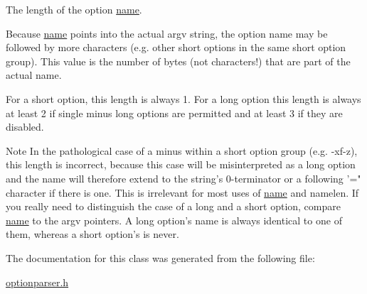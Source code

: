 \-The length of the option \hyperlink{classoption_1_1_option_a02a76b4896abd22d0ba8514362261de9}{name}. 

\-Because \hyperlink{classoption_1_1_option_a02a76b4896abd22d0ba8514362261de9}{name} points into the actual {\ttfamily argv} string, the option name may be followed by more characters (e.\-g. other short options in the same short option group). \-This value is the number of bytes (not characters!) that are part of the actual name.

\-For a short option, this length is always 1. \-For a long option this length is always at least 2 if single minus long options are permitted and at least 3 if they are disabled.

\begin{DoxyNote}{\-Note}
\-In the pathological case of a minus within a short option group (e.\-g. {\ttfamily -\/xf-\/z}), this length is incorrect, because this case will be misinterpreted as a long option and the name will therefore extend to the string's 0-\/terminator or a following '=" character if there is one. \-This is irrelevant for most uses of \hyperlink{classoption_1_1_option_a02a76b4896abd22d0ba8514362261de9}{name} and {\ttfamily namelen}. \-If you really need to distinguish the case of a long and a short option, compare \hyperlink{classoption_1_1_option_a02a76b4896abd22d0ba8514362261de9}{name} to the {\ttfamily argv} pointers. \-A long option's {\ttfamily name} is always identical to one of them, whereas a short option's is never. 
\end{DoxyNote}


\-The documentation for this class was generated from the following file\-:\begin{DoxyCompactItemize}
\item 
\hyperlink{optionparser_8h}{optionparser.\-h}\end{DoxyCompactItemize}
